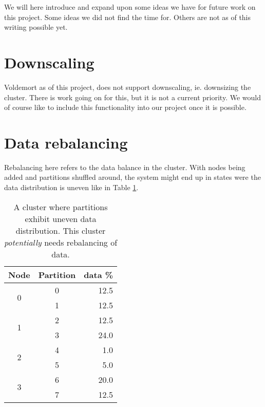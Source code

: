 
We will here introduce and expand upon some ideas we have for future work on this project. Some ideas we did not find the time for. Others are not as of this writing possible yet.

\section{Downscaling}
Voldemort as of this project, does not support downscaling, ie. downsizing the cluster. There is work going on for this, but it is not a current priority. We would of course like to include this functionality into our project once it is possible.

\section{Data rebalancing}
Rebalancing here refers to the data balance in the cluster. With nodes being added and partitions shuffled around, the system might end up in states were the data distribution is uneven like in Table \ref{tbl:datarebalance}.
\begin{center}
\begin{table}[h]
	\begin{tabular}{|c|c|r|}

		\multicolumn{1}{c}{Node} & 
		\multicolumn{1}{c}{Partition } & 
		\multicolumn{1}{c}{data \%} \\
		\hline

		\multirow{2}{*}{0} & 0 & 12.5 \\ \cline{2-3}
		 & 1 & 12.5 \\
		 \hline
		\multirow{2}{*}{1} & 2 & 12.5 \\ \cline{2-3}
		 & 3 & 24.0 \\
 		 \hline

		\multirow{2}{*}{2} & 4 & 1.0 \\ \cline{2-3}
		 & 5 & 5.0 \\
		
		\hline	
		
		\multirow{2}{*}{3} & 6 & 20.0 \\ \cline{2-3}
		 & 7 & 12.5 \\

		\hline
	\end{tabular}
	\caption{A cluster where partitions exhibit uneven data distribution. This cluster \emph{potentially} needs rebalancing of data.}
	\label{tbl:datarebalance}
\end{table}
\end{center}

